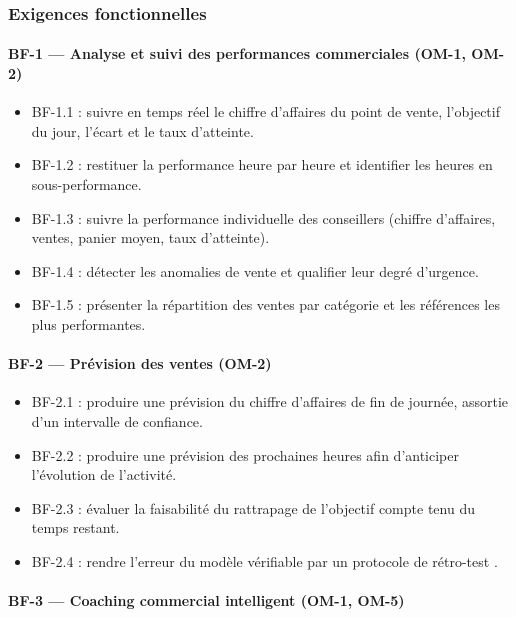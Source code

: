 \subsubsection{Exigences fonctionnelles}

\paragraph{BF-1 — Analyse et suivi des performances commerciales \textnormal{(OM-1, OM-2)}}

\begin{itemize}[label=--]
    \item BF-1.1 : suivre en temps réel le chiffre d'affaires du point de vente, l'objectif du jour, l'écart et le taux d'atteinte.
    \item BF-1.2 : restituer la performance heure par heure et identifier les heures en sous-performance.
    \item BF-1.3 : suivre la performance individuelle des conseillers (chiffre d'affaires, ventes, panier moyen, taux d'atteinte).
    \item BF-1.4 : détecter les anomalies de vente et qualifier leur degré d'urgence.
    \item BF-1.5 : présenter la répartition des ventes par catégorie et les références les plus performantes.
\end{itemize}

\paragraph{BF-2 — Prévision des ventes \textnormal{(OM-2)}}

\begin{itemize}[label=--]
    \item BF-2.1 : produire une prévision du chiffre d'affaires de fin de journée, assortie d'un intervalle de confiance.
    \item BF-2.2 : produire une prévision des prochaines heures afin d'anticiper l'évolution de l'activité.
    \item BF-2.3 : évaluer la faisabilité du rattrapage de l'objectif compte tenu du temps restant.
    \item BF-2.4 : rendre l'erreur du modèle vérifiable par un protocole de rétro-test \cite{hyndman2021fpp}.
\end{itemize}

\paragraph{BF-3 — Coaching commercial intelligent \textnormal{(OM-1, OM-5)}}

